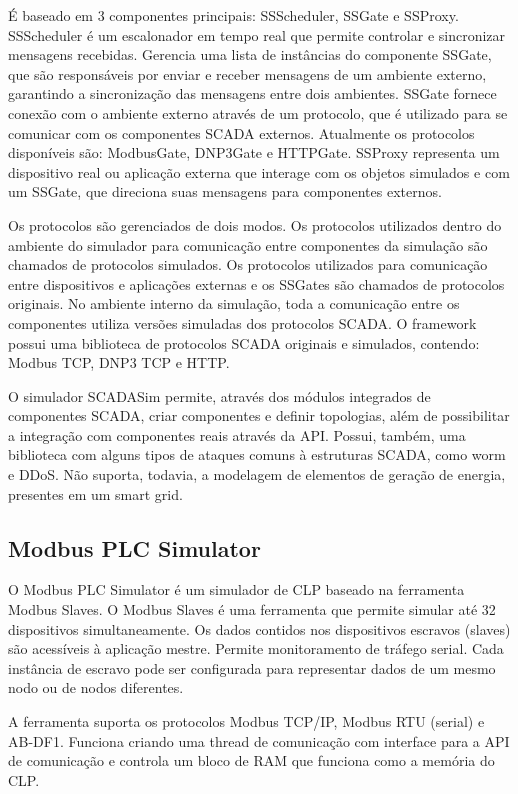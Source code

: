\documentclass[cic,tc]{iiufrgs}
\begin{document}
É baseado em 3 componentes principais: SSScheduler, SSGate e SSProxy.  SSScheduler é um escalonador em tempo real que permite controlar e sincronizar mensagens recebidas. Gerencia uma lista de instâncias do componente SSGate, que são responsáveis por enviar e receber mensagens de um ambiente externo, garantindo a sincronização das mensagens entre dois ambientes. SSGate fornece conexão com o ambiente externo através de um protocolo, que é utilizado para se comunicar com os componentes SCADA externos. Atualmente os protocolos disponíveis são: ModbusGate, DNP3Gate e HTTPGate. SSProxy representa um dispositivo real ou aplicação externa que interage com os objetos simulados e com um SSGate, que direciona suas mensagens para componentes externos.

Os protocolos são gerenciados de dois modos. Os protocolos utilizados dentro do ambiente do simulador para comunicação entre componentes da simulação são chamados de protocolos simulados. Os protocolos utilizados para comunicação entre dispositivos e aplicações externas e os SSGates são chamados de protocolos originais. No ambiente interno da simulação, toda a comunicação entre os componentes utiliza versões simuladas dos protocolos SCADA. O framework possui uma biblioteca de protocolos SCADA originais e simulados, contendo: Modbus TCP, DNP3 TCP e HTTP.

O simulador SCADASim permite, através dos módulos integrados de componentes SCADA, criar componentes e definir topologias, além de possibilitar a integração com componentes reais através da API. Possui, também, uma biblioteca com alguns tipos de ataques comuns à estruturas SCADA, como worm e DDoS. Não suporta, todavia, a modelagem de elementos de geração de energia, presentes em um smart grid.

\subsection{Modbus PLC Simulator}
O Modbus PLC Simulator \cite{plcsimwebsite} é um simulador de CLP baseado na ferramenta Modbus Slaves. O Modbus Slaves é uma ferramenta que permite simular até 32 dispositivos simultaneamente. Os dados contidos nos dispositivos escravos (slaves) são acessíveis à aplicação mestre. Permite monitoramento de tráfego serial. Cada instância de escravo pode ser configurada para representar dados de um mesmo nodo ou de nodos diferentes.

A ferramenta suporta os protocolos Modbus TCP/IP, Modbus RTU (serial) e AB-DF1. Funciona criando uma thread de comunicação com interface para a API de comunicação e controla um bloco de RAM que funciona como a memória do CLP.
\end{document}
